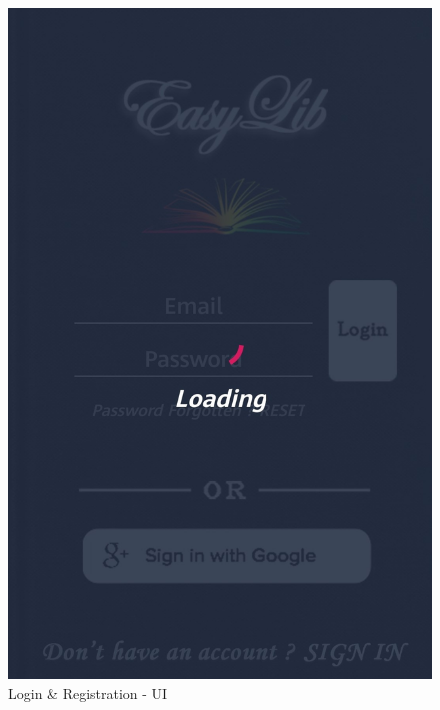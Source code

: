 \begin{figure}[H]
	\includegraphics[scale=0.15]{Images/UI/Login_Register/3}
	\caption{Login \& Registration - UI}
\end{figure}

